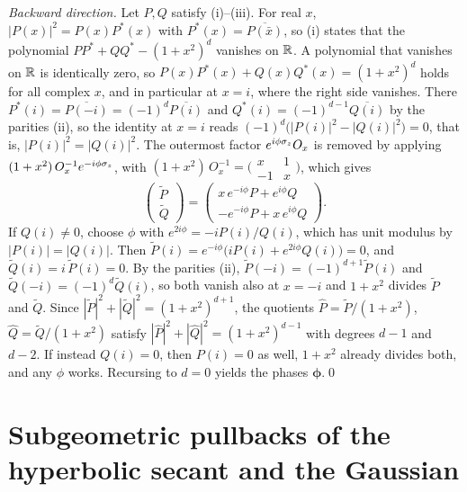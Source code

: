 \emph{Backward direction.}  Let $P,Q$ satisfy (i)--(iii).  For
real $x$, $|P(x)|^2=P(x)P^*(x)$ with $P^*(x)=\overline{P(\bar x)}$,
so (i) states that the polynomial $PP^*+QQ^*-(1+x^2)^d$ vanishes on
$\mathbb{R}$.  A polynomial that vanishes on $\mathbb{R}$ is identically zero, so
$P(x)P^*(x)+Q(x)Q^*(x)=(1+x^2)^d$ holds for all complex $x$, and in
particular at $x=i$, where the right side vanishes.  There
$P^*(i)=\overline{P(-i)}=(-1)^d\overline{P(i)}$ and
$Q^*(i)=(-1)^{d-1}\overline{Q(i)}$ by the parities (ii), so the
identity at $x=i$ reads $(-1)^d\bigl(|P(i)|^2-|Q(i)|^2\bigr)=0$,
that is, $|P(i)|^2=|Q(i)|^2$.  The outermost factor
$e^{i\phi\sigma_z}O_x$ is removed by applying
$(1+x^2)\,O_x^{-1}e^{-i\phi\sigma_z}$, with
$(1+x^2)\,O_x^{-1}=\bigl(\begin{smallmatrix}x&1\\-1&x
\end{smallmatrix}\bigr)$, which gives
\begin{equation}
	\begin{pmatrix}\widetilde P\\ \widetilde Q\end{pmatrix}
	=\begin{pmatrix} x\,e^{-i\phi}P+e^{i\phi}Q\\
		-e^{-i\phi}P+x\,e^{i\phi}Q\end{pmatrix}.
\end{equation}
If $Q(i)\neq 0$, choose $\phi$ with $e^{2i\phi}=-iP(i)/Q(i)$, which
has unit modulus by $|P(i)|=|Q(i)|$.  Then
$\widetilde P(i)=e^{-i\phi}\bigl(iP(i)+e^{2i\phi}Q(i)\bigr)=0$, and
$\widetilde Q(i)=i\,\widetilde P(i)=0$.  By the parities (ii),
$\widetilde P(-i)=(-1)^{d+1}\widetilde P(i)$ and
$\widetilde Q(-i)=(-1)^{d}\widetilde Q(i)$, so both vanish also at
$x=-i$ and $1+x^2$ divides $\widetilde P$ and $\widetilde Q$.  Since
$|\widetilde P|^2+|\widetilde Q|^2=(1+x^2)^{d+1}$, the
quotients $\widehat
P=\widetilde P/(1+x^2)$, $\widehat Q=\widetilde Q/(1+x^2)$ satisfy
$|\widehat P|^2+|\widehat Q|^2=(1+x^2)^{d-1}$ with degrees $d-1$ and
$d-2$.  If instead $Q(i)=0$, then $P(i)=0$ as well, $1+x^2$
already divides both, and any $\phi$ works.  Recursing to $d=0$
yields the phases $\bm\phi$.\qed

\section{Subgeometric pullbacks of the hyperbolic secant and the Gaussian}
\label{app:sech}

